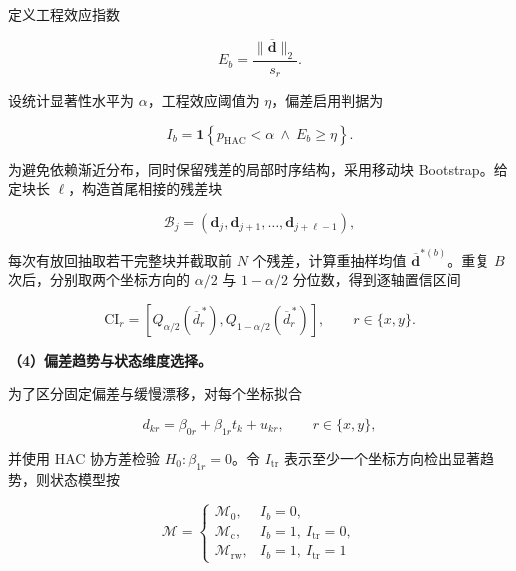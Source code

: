 定义工程效应指数

\begin{equation}
E_b=\frac{\|\overline{\mathbf d}\|_2}{s_r}.
\label{eq:q3-engineering-effect}
\end{equation}

设统计显著性水平为 \(\alpha\)，工程效应阈值为 \(\eta\)，偏差启用判据为

\begin{equation}
I_b=
\mathbf 1\!\left\{
p_{\mathrm{HAC}}<\alpha
\ \land\
E_b\ge\eta
\right\}.
\label{eq:q3-bias-decision}
\end{equation}

为避免依赖渐近分布，同时保留残差的局部时序结构，采用移动块
Bootstrap\cite{kunsch1989}。给定块长 \(\ell\)，构造首尾相接的残差块

\begin{equation}
\mathcal B_j=
\left(
\mathbf d_j,\mathbf d_{j+1},\ldots,\mathbf d_{j+\ell-1}
\right),
\label{eq:q3-bootstrap-block}
\end{equation}

每次有放回抽取若干完整块并截取前 \(N\) 个残差，计算重抽样均值
\(\overline{\mathbf d}^{*(b)}\)。重复 \(B\) 次后，分别取两个坐标方向的
\(\alpha/2\) 与 \(1-\alpha/2\) 分位数，得到逐轴置信区间

\begin{equation}
\mathrm{CI}_r=
\left[
Q_{\alpha/2}
\!\left(\overline d_r^{\,*}\right),
Q_{1-\alpha/2}
\!\left(\overline d_r^{\,*}\right)
\right],
\qquad r\in\{x,y\}.
\label{eq:q3-bootstrap-ci-estimator}
\end{equation}

\noindent\textbf{（4）偏差趋势与状态维度选择。}

为了区分固定偏差与缓慢漂移，对每个坐标拟合

\begin{equation}
d_{kr}=\beta_{0r}+\beta_{1r}t_k+u_{kr},
\qquad r\in\{x,y\},
\label{eq:q3-trend-model}
\end{equation}

并使用 HAC 协方差检验 \(H_0:\beta_{1r}=0\)。令 \(I_{\mathrm{tr}}\)
表示至少一个坐标方向检出显著趋势，则状态模型按

\begin{equation}
\mathcal M=
\begin{cases}
\mathcal M_0,& I_b=0,\\
\mathcal M_{\mathrm c},& I_b=1,\ I_{\mathrm{tr}}=0,\\
\mathcal M_{\mathrm{rw}},& I_b=1,\ I_{\mathrm{tr}}=1
\end{cases}
\label{eq:q3-model-selection}
\end{equation}

